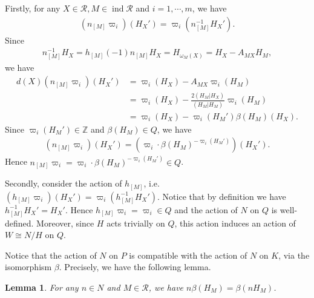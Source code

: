 \documentclass[12pt]{amsart}
\newtheorem{lemma}[theorem]{Lemma}
\begin{document}
Firstly, for any $X \in \mathcal{R}, M\in \operatorname{ind}\mathcal{R}$ and $i=1,\cdots,m$, we have 
\begin{align*}
    (n_{[M]}\varpi_i )(H_X') = \varpi_i(n_{[M]}^{-1} H_X').
\end{align*} 
Since 
\begin{align*}
    n_{[M]}^{-1}H_X = h_{[M]}(-1)n_{[M]}H_X =  H_{\omega_M(X)} = H_X - A_{MX}H_M,
\end{align*}
we have 
\begin{align*}
    d(X)(n_{[M]}\varpi_i )(H_X') &= \varpi_i(H_X) - A_{MX}\varpi_i(H_M) \\
    & = \varpi_i(H_X) - \frac{2(H_M|H_X)}{(H_M|H_M)}\varpi_i(H_M) \\
    &= \varpi_i(H_X) - \varpi_i(H_M')\beta(H_M)(H_X). 
\end{align*}
Since $\varpi_i(H_M')\in \mathbb{Z}$ and $\beta(H_M)\in Q$, we have 
\begin{align*}
    (n_{[M]}\varpi_i )(H_X') = (\varpi_i \cdot \beta(H_M)^{-\varpi_i(H_M')})(H_X').
\end{align*}
Hence $n_{[M]}\varpi_i = \varpi_i \cdot \beta(H_M)^{-\varpi_i(H_M')} \in Q$.

Secondly, consider the action of $h_{[M]}$, i.e. $(h_{[M]}\varpi_i)(H_X') = \varpi_i(h_{[M]}^{-1} H_X')$.
Notice that by definition we have $h_{[M]}^{-1}H_X' = H_X'$.
Hence $h_{[M]}\varpi_i = \varpi_i \in Q$ and the action of $N$ on $Q$ is well-defined.
Moreover, since $H$ acts trivially on $Q$, this action induces an action of $W\cong N/H$ on $Q$.

Notice that the action of $N$ on $P$ is compatible with the action of $N$ on $K$, via the isomorphism $\beta$.
Precisely, we have the following lemma.

\begin{lemma}
    For any $n\in N$ and $M\in \mathcal{R}$, we have $n\beta(H_M) = \beta(nH_M)$.
\end{lemma}
\end{document}
